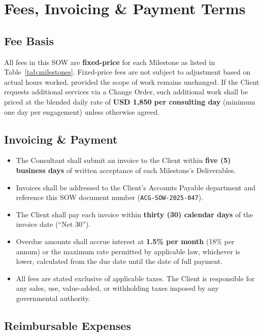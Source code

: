 
\section{Fees, Invoicing \& Payment Terms}
\label{sec:fees}

\subsection{Fee Basis}

All fees in this SOW are \textbf{fixed-price} for each Milestone as listed in
Table~\ref{tab:milestones}. Fixed-price fees are not subject to adjustment based on
actual hours worked, provided the scope of work remains unchanged. If the Client requests
additional services via a Change Order, such additional work shall be priced at the
blended daily rate of \textbf{USD 1{,}850 per consulting day} (minimum one day per
engagement) unless otherwise agreed.

\subsection{Invoicing \& Payment}

\begin{itemize}
  \item The Consultant shall submit an invoice to the Client within \textbf{five (5) business
    days} of written acceptance of each Milestone's Deliverables.
  \item Invoices shall be addressed to the Client's Accounts Payable department and
    reference this SOW document number (\texttt{ACG-SOW-2025-047}).
  \item The Client shall pay each invoice within \textbf{thirty (30) calendar days} of the
    invoice date (``Net 30'').
  \item Overdue amounts shall accrue interest at \textbf{1.5\% per month} (18\% per annum)
    or the maximum rate permitted by applicable law, whichever is lower, calculated from
    the due date until the date of full payment.
  \item All fees are stated exclusive of applicable taxes. The Client is responsible for
    any sales, use, value-added, or withholding taxes imposed by any governmental authority.
\end{itemize}

\subsection{Reimbursable Expenses}

